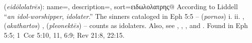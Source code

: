 \item[Idolater,]

(\textit{eidōlolatrēs}):
{
    name=,
    description={},
    sort=ειδωλολατρης@
}
According to Liddell ``\emph{an idol-worshipper}, \emph{idolater}.'' The sinners cataloged in Eph 5:5 --  (\emph{pornos}) i.  ii. ,  (\emph{akathartos}) ,  (\emph{pleonektēs})  -- counts as idolaters. Also, see , , , and .
Found in Eph 5:5; 1~Cor 5:10, 11, 6:9; Rev 21:8, 22:15.
